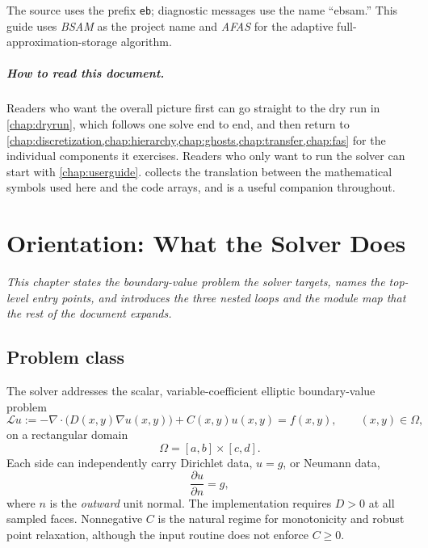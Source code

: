 \documentclass[11pt,oneside,openany]{book}
\newcommand{\code}[1]{\textnormal{\texttt{#1}}}
\begin{document}
The source uses the prefix \code{eb}; diagnostic messages use the name ``ebsam.'' This guide uses \emph{BSAM} as the project name and \emph{AFAS} for the adaptive full-approximation-storage algorithm.

\paragraph{How to read this document.} Readers who want the overall picture first can go straight to the dry run in \cref{chap:dryrun}, which follows one solve end to end, and then return to \cref{chap:discretization,chap:hierarchy,chap:ghosts,chap:transfer,chap:fas} for the individual components it exercises. Readers who only want to run the solver can start with \cref{chap:userguide}.  collects the translation between the mathematical symbols used here and the code arrays, and is a useful companion throughout.

\tableofcontents
\listoffigures
\listofalgorithms

\mainmatter

\chapter{Orientation: What the Solver Does}
\label{chap:orientation}

\emph{This chapter states the boundary-value problem the solver targets, names the top-level entry points, and introduces the three nested loops and the module map that the rest of the document expands.}

\section{Problem class}
The solver addresses the scalar, variable-coefficient elliptic boundary-value problem
\begin{equation}
  \mathcal{L}u
  := -\nabla\!\cdot\!\bigl(D(x,y)\nabla u(x,y)\bigr)
     + C(x,y)u(x,y)
  = f(x,y),
  \qquad (x,y)\in\Omega,
  \label{eq:pde}
\end{equation}
on a rectangular domain
\[
  \Omega=[a,b]\times[c,d].
\]
Each side can independently carry Dirichlet data, $u=g$, or Neumann data,
\[
  \frac{\partial u}{\partial n}=g,
\]
where $n$ is the \emph{outward} unit normal. The implementation requires $D>0$ at all sampled faces. Nonnegative $C$ is the natural regime for monotonicity and robust point relaxation, although the input routine does not enforce $C\ge 0$.
\end{document}
